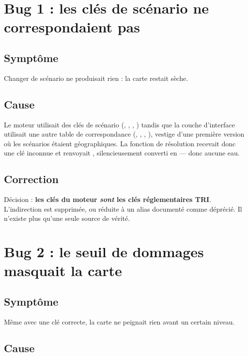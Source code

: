 \section{Bug 1 : les clés de scénario ne correspondaient pas}

\subsection{Symptôme}

Changer de scénario ne produisait rien : la carte restait sèche.

\subsection{Cause}

Le moteur utilisait des clés de scénario (, ,
, ) tandis que la couche d'interface utilisait une
autre table de correspondance (, , ,
), vestige d'une première version où les scénarios étaient
géographiques. La fonction de résolution recevait donc une clé inconnue et
renvoyait , silencieusement converti en  — donc
aucune eau.

\subsection{Correction}

Décision  : \textbf{les clés du moteur \emph{sont} les clés
réglementaires TRI}. L'indirection est supprimée, ou réduite à un alias
documenté comme déprécié. Il n'existe plus qu'une seule source de vérité.

\section{Bug 2 : le seuil de dommages masquait la carte}

\subsection{Symptôme}

Même avec une clé correcte, la carte ne peignait rien avant un certain niveau.

\subsection{Cause}

